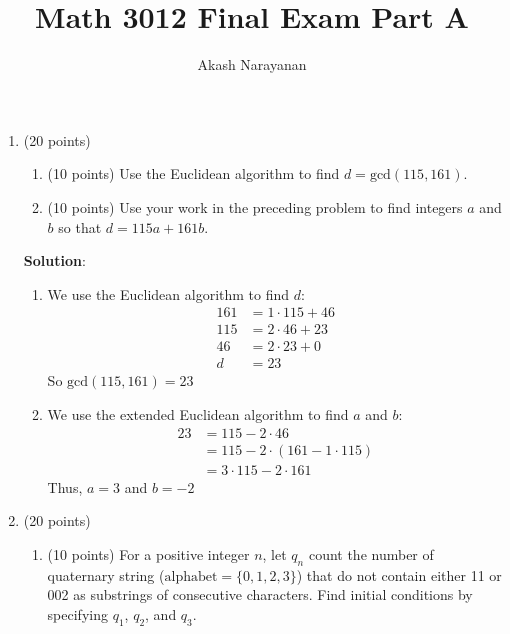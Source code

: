 \documentclass[12pt]{article}
\title{Math 3012 Final Exam Part A}
\author{Akash Narayanan}
\newenvironment{solution}{
\begin{mdframed}
  { {\bfseries Solution}: }}{
\end{mdframed}}
\begin{document}
  \maketitle

  \begin{enumerate}

    \item (20 points)
    \begin{enumerate}[label=({\alph*})]
      \item (10 points) Use the Euclidean algorithm to find \(d = \text{gcd}(115, 161)\).

      \item (10 points) Use your work in the preceding problem to find integers \(a\) and \(b\) so that \(d = 115a + 161b\).
    \end{enumerate}

    \begin{solution}
      \begin{enumerate}[label=({\alph*})]
        \item We use the Euclidean algorithm to find \(d\):
        \begin{align*}
          161 &= 1 \cdot 115 + 46 \\
          115 &= 2 \cdot 46  + 23 \\
          46  &= 2 \cdot 23  + 0  \\
          d &= 23
        \end{align*}
        So \(\text{gcd}(115, 161) = 23\)

        \item We use the extended Euclidean algorithm to find \(a\) and \(b\):
        \begin{align*}
          23 &= 115 - 2 \cdot 46 \\
             &= 115 - 2 \cdot (161 - 1 \cdot 115) \\
             &= 3 \cdot 115 - 2 \cdot 161
        \end{align*}
        Thus, \(a = 3\) and \(b = -2\)
    \end{enumerate}
    \end{solution}

    \pagebreak

    \item (20 points)
    \begin{enumerate}[label=({\alph*})]
      \item (10 points) For a positive integer \(n\), let \(q_{n}\) count the number of quaternary string (\(\text{alphabet} = \{0, 1, 2, 3\}\)) that do not contain either 11 or 002 as substrings of consecutive characters.
      Find initial conditions by specifying \(q_{1}\), \(q_{2}\), and \(q_{3}\).


\end{enumerate}
\end{enumerate}
\end{document}
